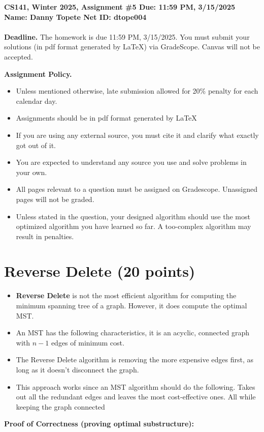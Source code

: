 \documentclass{article}[12pt]
\newcommand{\policy}[1]{#1}
\newcommand{\policy}[1]{}
\newcommand{\deadline}{11:59 PM, 3/15/2025}
\newcommand{\assigntitle}[1]{{
  \noindent \large \bf
  CS141, Winter 2025,
  Assignment \##1 \hfill Due: {\deadline}\\
  Name: Danny Topete %
  \hspace{2.5in}
  Net ID: dtope004 %
  \\
  [-.05in]
  \mbox{}\hrulefill \mbox{}\\}}
\begin{document}
\assigntitle{5}{}
\policy{\textbf{Deadline.} The homework is due 11:59 PM, 3/15/2025. You must submit your solutions (in pdf
format generated by LaTeX) via GradeScope. Canvas will not be accepted.}\\
\date{}
\policy{\textbf{Assignment Policy.}
\begin{itemize}
    \item Unless mentioned otherwise, late submission allowed for 20\% penalty for each calendar day.
    \item Assignments should be in pdf format generated by LaTeX
    \item If you are using any external source, you must cite it and clarify what exactly got out of it.
    \item You are expected to understand any source you use and solve problems in your own.
    \item All pages relevant to a question must be assigned on Gradescope. Unassigned pages will not be graded.
    \item Unless stated in the question, your designed algorithm should use the most optimized algorithm you have learned so far. A too-complex algorithm may result in penalties.
\end{itemize}


}


\section{Reverse Delete (20 points)}
\begin{itemize}
  \item \textbf{Reverse Delete} is not the most efficient algorithm for computing the minimum spanning tree of a graph.
    However, it does compute the optimal MST.
  \item An MST has the following characteristics, it is an acyclic, connected graph with $n-1$ edges
    of minimum cost.
  \item The Reverse Delete algorithm is removing the more expensive edges first, as long as it doesn't disconnect the graph.
  \item This approach works since an MST algorithm should do the following.
    Takes out all the redundant edges and leaves the most cost-effective ones.
    All while keeping the graph connected
\end{itemize}

\textbf{Proof of Correctness (proving optimal substructure):}
\end{document}
